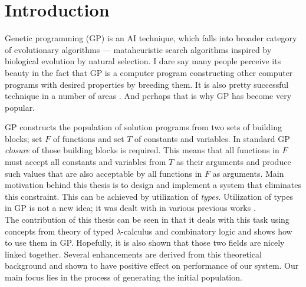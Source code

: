 \documentclass[12pt,a4paper]{report}
\begin{document}
\chapter*{Introduction}



Genetic programming (GP) is an AI technique, which falls into broader category 
of evolutionary algorithms  ---  mataheuristic  search algorithms inspired  by 
biological evolution by natural selection. I dare say many people perceive its beauty in the  fact that GP is a computer program  constructing other computer programs %
with desired properties by breeding them. 
It is also pretty successful technique in a number of areas \cite{koza05}. 
And perhaps that is why GP has become very popular.    

GP constructs the population of solution programs from 
two sets of building blocks; set $F$ of functions 
and set $T$ of constants and variables. 
In standard GP \textit{closure} of those 
building blocks is required.
This means that all functions in $F$ must accept all 
constants and variables from $T$ as their arguments and produce 
such values that are also acceptable by all functions in $F$ as arguments.
Main motivation behind this thesis is to design and implement a system that
eliminates this constraint. 
This can be achieved by utilization of \textit{types}.
Utilization of types in GP is not a new idea; 
it was dealt with in various previous works 
\cite{yu01,montana95,haynes96,olsson94}.\\

The contribution of this thesis can be seen 
in that it deals with this task using concepts from
theory of typed $\lambda$-calculus and combinatory logic
and shows how to use them in GP. 
Hopefully, it is also shown that those two fields are
nicely linked together.
Several enhancements are derived from this theoretical background
and shown to have positive effect on performance of our system.  
Our main focus lies in the process of generating the initial population.
 
\end{document}
